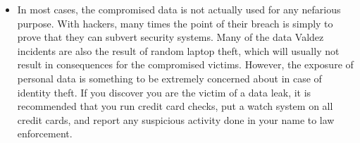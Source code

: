 \documentclass[12pt]{article}
\begin{document}
\begin{itemize}
 

\item In most cases, the compromised data is not actually used for any nefarious purpose. With hackers, many times the point of their breach is simply to prove that they can subvert security systems. Many of the data Valdez incidents are also the result of random laptop theft, which will usually not result in consequences for the compromised victims. However, the exposure of personal data is something to be extremely concerned about in case of identity theft. If you discover you are the victim of a data leak, it is recommended that you run credit card checks, put a watch system on all credit cards, and report any suspicious activity done in your name to law enforcement.
\end{itemize}
\end{document}
